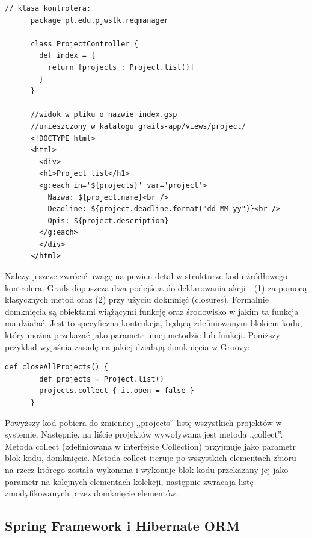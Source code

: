     \begin{lstlisting}[caption={widok i kontroler}, label={lst:contView}]
      // klasa kontrolera:
      package pl.edu.pjwstk.reqmanager

      class ProjectController {
        def index = { 
          return [projects : Project.list()]
        }   
      }

      //widok w pliku o nazwie index.gsp 
      //umieszczony w katalogu grails-app/views/project/
      <!DOCTYPE html>
      <html>
        <div>
        <h1>Project list</h1>
        <g:each in='${projects}' var='project'>
          Nazwa: ${project.name}<br />
          Deadline: ${project.deadline.format("dd-MM yy")}<br />
          Opis: ${project.description} 
        </g:each>
        </div>
      </html>

    \end{lstlisting}

    Należy jeszcze zwrócić uwagę na pewien detal w strukturze kodu źródłowego kontrolera. Grails dopuszcza dwa podejścia do deklarowania akcji - (1) za pomocą klasycznych metod oraz (2) przy użyciu dokmnięć (closures). Formalnie domknięcia są obiektami wiążącymi funkcję oraz środowisko w jakim ta funkcja ma działać. Jest to specyficzna kontrukcja, będącą zdefiniowanym blokiem kodu, który można przekazać jako parametr innej metodzie lub funkcji. Poniższy przykład wyjaśnia zasadę na jakiej działają domknięcia w Groovy: 
    
    \begin{lstlisting}[caption={domknięcie w Groovy}, label={lst:closure}]
      def closeAllProjects() {
        def projects = Project.list()
        projects.collect { it.open = false }
      }
    \end{lstlisting} 
    
    Powyższy kod pobiera do zmiennej ,,projects'' listę wszystkich projektów w systemie. Następnie, na liście projektów wywoływana jest metoda ,,collect''. Metoda collect (zdefiniowana w interfejsie Collection) przyjmuje jako parametr blok kodu, domknięcie. Metoda collect iteruje po wszystkich elementach zbioru na rzecz którego została wykonana i wykonuje blok kodu przekazany jej jako parametr na kolejnych elementach kolekcji, następnie zwracaja listę zmodyfikowanych przez domknięcie elementów.

    \subsection{Spring Framework i Hibernate ORM}

